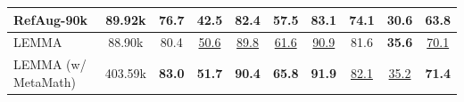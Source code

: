 \begin{table}[h!]
{\begin{tabular}{l|c|cc|ccccc|c}
        RefAug-90k & 89.92k & 76.7 & 42.5 & 82.4 & 57.5 & 83.1 & 74.1 & 30.6 & 63.8  \\
        \midrule
        \rowcolor {gray!20} LEMMA & 88.90k & 80.4 & \underline{50.6} & \underline{89.8} & \underline{61.6} & \underline{90.9} & 81.6 & \bf 35.6 & \underline{70.1}  \\
        \rowcolor {gray!20} LEMMA (w/ MetaMath) & 403.59k & \bf 83.0 & \bf 51.7 & \bf 90.4 & \bf 65.8 & \bf 91.9 & \underline{82.1} & \underline{35.2} & \bf 71.4  \\
        \bottomrule[0.15em]
    \end{tabular}%
    }
\end{table}
